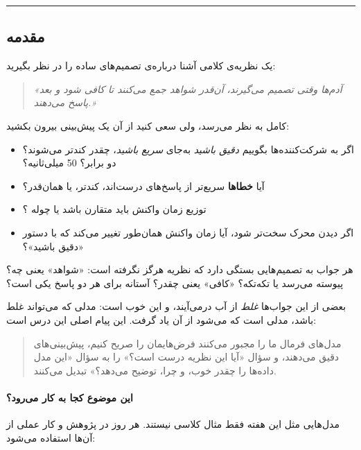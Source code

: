 \begin{center}\rule{0.5\linewidth}{0.5pt}\end{center}

\subsection{مقدمه}

یک نظریه‌ی کلامی آشنا درباره‌ی تصمیم‌های ساده را در نظر بگیرید:

\begin{quote}
\emph{«آدم‌ها وقتی تصمیم می‌گیرند، آن‌قدر شواهد جمع می‌کنند تا کافی شود و
بعد پاسخ می‌دهند.»}
\end{quote}

کامل به نظر می‌رسد، ولی سعی کنید از آن یک پیش‌بینی بیرون بکشید:

\begin{itemize}
\tightlist
\item
  اگر به شرکت‌کننده‌ها بگوییم \emph{دقیق باشید} به‌جای \emph{سریع باشید}،
  چقدر کندتر می‌شوند؟ دو برابر؟ 50 میلی‌ثانیه؟
\item
  آیا \textbf{خطاها} سریع‌تر از پاسخ‌های درست‌اند، کندتر، یا همان‌قدر؟
\item
  توزیع زمان واکنش  باید متقارن باشد یا چوله ؟
\item
  اگر دیدن محرک سخت‌تر شود، آیا زمان واکنش همان‌طور تغییر می‌کند که با
  دستور «دقیق باشید»؟
\end{itemize}

هر جواب به تصمیم‌هایی بستگی دارد که نظریه هرگز نگرفته است: «شواهد» یعنی
چه؟ پیوسته می‌رسد یا تکه‌تکه؟ «کافی» یعنی چقدر؟ آستانه برای هر دو پاسخ یکی
است؟

بعضی از این جواب‌ها \emph{غلط} از آب درمی‌آیند، و این خوب است: مدلی که
می‌تواند غلط باشد، مدلی است که می‌شود از آن یاد گرفت. این پیام اصلی این
درس است:

\begin{quote}
مدل‌های فرمال  ما را مجبور می‌کنند فرض‌هایمان را صریح کنیم،
پیش‌بینی‌های دقیق می‌دهند، و سؤال «آیا این نظریه درست است؟» را به سؤال «این
مدل داده‌ها را چقدر خوب، و چرا، توضیح می‌دهد؟» تبدیل می‌کنند.
\end{quote}

\paragraph{این موضوع کجا به کار می‌رود؟}

مدل‌هایی مثل  این هفته فقط مثال کلاسی نیستند. هر روز در
پژوهش و کار عملی از آن‌ها استفاده می‌شود:

